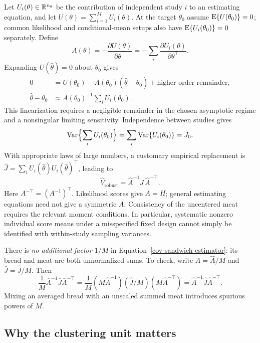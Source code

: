 Let $U_i(\theta)\in\mathbb R^{n_\theta}$ be the contribution of independent
study $i$ to an estimating equation, and let
$U(\theta)=\sum_{i=1}^M U_i(\theta)$.  At the target $\theta_0$ assume
$\operatorname{E}\{U(\theta_0)\}=0$; common likelihood and conditional-mean setups
also have $\operatorname{E}\{U_i(\theta_0)\}=0$ separately.  Define
\[
 A(\theta)=-\frac{\partial U(\theta)}{\partial\theta^\top}
          =-\sum_i\frac{\partial U_i(\theta)}{\partial\theta^\top}.
\]
Expanding $U(\widehat\theta)=0$ about $\theta_0$ gives
\begin{align}
 0&=U(\theta_0)-A(\theta_0)(\widehat\theta-\theta_0)
                      +\text{higher-order remainder},\\
 \widehat\theta-\theta_0
 &\approx A(\theta_0)^{-1}\sum_iU_i(\theta_0).
 \label{cov-taylor-linearization}
\end{align}
This linearization requires a negligible remainder in the chosen
asymptotic regime and a nonsingular limiting sensitivity.  Independence
between studies gives
\[
 \operatorname{Var}\Bigl\{\sum_iU_i(\theta_0)\Bigr\}
 =\sum_i\operatorname{Var}\{U_i(\theta_0)\}=J_0 .
 \]
With appropriate laws of large numbers, a customary empirical replacement
is $\widehat J=\sum_iU_i(\widehat\theta)U_i(\widehat\theta)^\top$,
leading to
\begin{equation}
 \widehat V_{\mathrm{robust}}
 =\widehat A^{-1}\widehat J\,\widehat A^{-\top}.
 \label{cov-sandwich-estimator}
\end{equation}
Here $A^{-\top}=(A^{-1})^\top$.  Likelihood scores give $A=H$;
general estimating equations need not give a symmetric $A$.
Consistency of the uncentered meat requires the relevant moment
conditions.  In particular, systematic nonzero individual score means
under a misspecified fixed design cannot simply be identified with
within-study sampling variances.

There is \emph{no additional factor $1/M$} in
Equation~\eqref{cov-sandwich-estimator}: its bread and meat are both
unnormalized sums.  To check, write
$\bar A=\widehat A/M$ and $\bar J=\widehat J/M$.  Then
\[
 \frac1M\bar A^{-1}\bar J\bar A^{-\top}
 =\frac1M(M\widehat A^{-1})(\widehat J/M)
                     (M\widehat A^{-\top})
 =\widehat A^{-1}\widehat J\widehat A^{-\top}.
\]
Mixing an averaged bread with an unscaled summed meat introduces
spurious powers of $M$.

\subsection{Why the clustering unit matters}
\label{cov-study-clustering}

